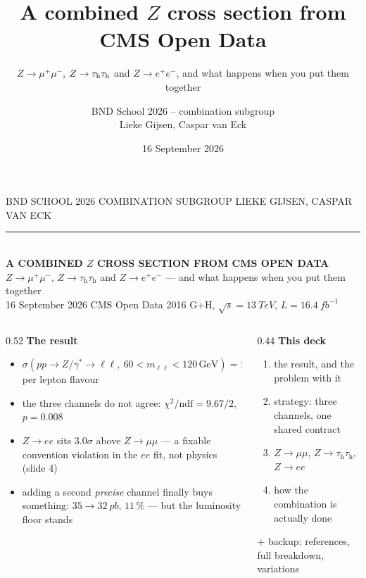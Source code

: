 \documentclass[aspectratio=169,9pt,t]{beamer}
\title{A combined \texorpdfstring{$Z$}{Z} cross section from CMS Open Data}
\subtitle{$Z\to\mu^{+}\mu^{-}$, $Z\to\tauh\tauh$ and $Z\to e^{+}e^{-}$, and what happens when you put them together}
\author{BND School 2026 -- combination subgroup\\[2pt]{\small Lieke Gijsen, Caspar van Eck}}
\date{16 September 2026}
\newcommand{\Z}{\ensuremath{Z/\gamma^{*}}}
\newcommand{\mm}{\ensuremath{\mu\mu}}
\newcommand{\tauh}{\ensuremath{\tau_{\mathrm{h}}}}
\newcommand{\ee}{\ensuremath{ee}}
\newcommand{\mll}{\ensuremath{m_{\ell\ell}}}
\newcommand{\pb}{\ensuremath{\,\mathrm{pb}}}
\newcommand{\sigll}{\ensuremath{\sigma(pp\to\Z\to\ell\ell,\ 60<\mll<120\,\mathrm{GeV})}}
\begin{document}
\begin{frame}
\vspace{4mm}
{\color{gray}\footnotesize BND SCHOOL 2026 \quad\textbullet\quad COMBINATION SUBGROUP \quad\textbullet\quad
 LIEKE GIJSEN, CASPAR VAN ECK}\\[1.5mm]
{\color{comb}\rule{\textwidth}{0.8pt}}\\[3mm]
{\color{mumu}\LARGE\textbf{A COMBINED $Z$ CROSS SECTION FROM CMS OPEN DATA}}\\[2.5mm]
{\large $Z\to\mu^{+}\mu^{-}$, $Z\to\tauh\tauh$ and $Z\to e^{+}e^{-}$ --- and what happens when you put them together}\\[1mm]
{\color{gray}\small 16 September 2026 \quad\textbullet\quad CMS Open Data 2016 G+H,
 $\sqrt{s} = \SI{13}{TeV}$, $L = \SI{16.4}{fb^{-1}}$}\\[4mm]
\begin{columns}[T]
\begin{column}{0.52\textwidth}\small
\textbf{The result}
\begin{itemize}\setlength\itemsep{1pt}
\item $\sigll = \mathbf{1980 \pm 32\pb}$ per lepton flavour
\item \alert{the three channels do not agree}: $\chi^{2}/\mathrm{ndf} = 9.67/2$, $p = 0.008$
\item $Z\to\ee$ sits $3.0\sigma$ above $Z\to\mm$ --- a \alert{fixable convention violation}
      in the $\ee$ fit, not physics (slide 4)
\item adding a second \emph{precise} channel finally buys something: $35 \to \SI{32}{pb}$,
      $11\,\%$ --- but the luminosity floor stands
\end{itemize}
\end{column}
\begin{column}{0.44\textwidth}\small
\textbf{This deck}
\begin{enumerate}\setlength\itemsep{1pt}
\item the result, and the problem with it
\item strategy: three channels, one shared contract
\item $Z\to\mm$, $Z\to\tauh\tauh$, $Z\to\ee$
\item how the combination is actually done
\end{enumerate}
\vspace{1mm}
{\footnotesize + backup: references, full breakdown, variations}
\end{column}
\end{columns}
\end{frame}
\end{document}
